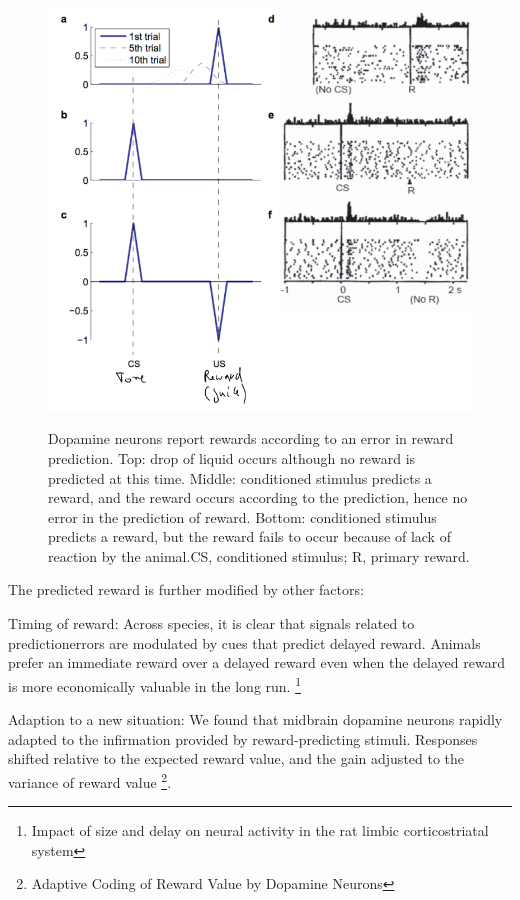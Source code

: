 \documentclass[main]{subfiles}
\begin{document}
\begin{figure}[H]
	\centering
	\includegraphics[width=0.9\linewidth]{08_ReinforcementLearning/figures/dopamine-rpe.png}
	\label{fig:dopamine-rpe}
	\caption{ Dopamine neurons report rewards according to an error in reward prediction. Top: drop of liquid occurs although no reward is predicted at this time. Middle: conditioned stimulus predicts a reward, and the reward occurs according to the prediction, hence no error in the prediction of reward. Bottom: conditioned stimulus predicts a reward, but the reward fails to occur because of lack of reaction by the animal.CS, conditioned stimulus; R, primary reward.}
\end{figure}

The predicted reward is further modified by other factors: 

Timing of reward: Across species, it is clear that signals related to predictionerrors are modulated by cues that predict delayed reward. Animals prefer an immediate reward over a delayed reward even when the delayed reward is more economically valuable in the long run. \footnote{Impact of size and delay on neural activity in the rat limbic corticostriatal system}

Adaption to a new situation: We found that midbrain dopamine neurons rapidly adapted to the infirmation provided by reward-predicting stimuli. Responses shifted relative to the expected reward value, and the gain adjusted to the variance of reward value \footnote{Adaptive Coding of Reward Value by Dopamine Neurons}.
\end{document}
